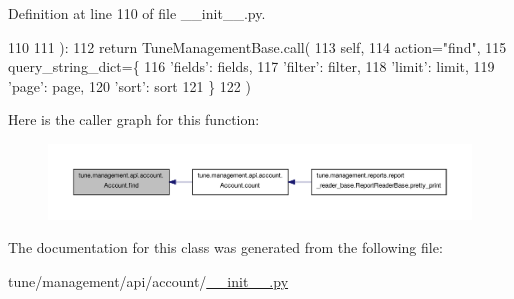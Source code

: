 Definition at line 110 of file \-\_\-\-\_\-init\-\_\-\-\_\-.\-py.


\begin{DoxyCode}
110 
111         ):
112         \textcolor{keywordflow}{return} TuneManagementBase.call(
113             self,
114             action=\textcolor{stringliteral}{"find"},
115             query\_string\_dict=\{
116                 \textcolor{stringliteral}{'fields'}: fields,
117                 \textcolor{stringliteral}{'filter'}: filter,
118                 \textcolor{stringliteral}{'limit'}: limit,
119                 \textcolor{stringliteral}{'page'}: page,
120                 \textcolor{stringliteral}{'sort'}: sort
121             \}
122         )
\end{DoxyCode}


Here is the caller graph for this function\-:
\nopagebreak
\begin{figure}[H]
\begin{center}
\leavevmode
\includegraphics[width=350pt]{classtune_1_1management_1_1api_1_1account_1_1Account_af37c9d36cde138ff763e9a2b94b6218f_icgraph}
\end{center}
\end{figure}




The documentation for this class was generated from the following file\-:\begin{DoxyCompactItemize}
\item 
tune/management/api/account/\hyperlink{management_2api_2account_2____init_____8py}{\-\_\-\-\_\-init\-\_\-\-\_\-.\-py}\end{DoxyCompactItemize}
